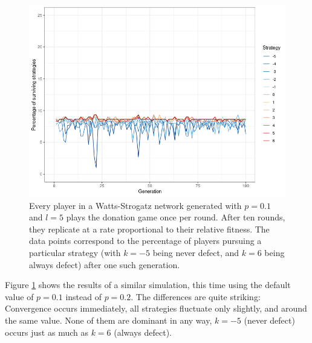\documentclass{JASSS}
\begin{document}
\begin{figure}
	\centering
	\includegraphics[width=\linewidth]{./figures/results_WS_N300_truthful_new_default.png}
	\caption{Every player in a Watts-Strogatz network generated with $p=0.1$ and $l=5$ plays the donation game once per round. After ten rounds, they replicate at a rate proportional to their relative fitness. The data points correspond to the percentage of players pursuing a particular strategy (with $k=-5$ being never defect, and $k=6$ being always defect) after one such generation.}
	\label{WS_300_default}
\end{figure}

Figure \ref{WS_300_default} shows the results of a similar simulation, this time using the default value of $p=0.1$ instead of $p=0.2$. The differences are quite striking: Convergence occurs immediately, all strategies fluctuate only slightly, and around the same value. None of them are dominant in any way, $k=-5$ (never defect) occurs just as much as $k=6$ (always defect).
\end{document}
